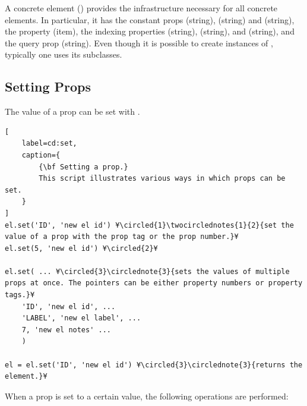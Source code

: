 \documentclass{tufte-handout}
\begin{document}
A concrete element () provides the infrastructure necessary for all concrete elements. 
In particular, it has the constant props  (string),  (string) and  (string), the property  (item), the indexing properties  (string),  (string), and  (string), and the query prop  (string).
Even though it is possible to create instances of , typically one uses its subclasses.

\subsection{Setting Props}

The value of a prop can be set with .
%
\begin{lstlisting}[
	label=cd:set,
	caption={
		{\bf Setting a prop.}
		This script illustrates various ways in which props can be set.
	}
]
el.set('ID', 'new el id') ¥\circled{1}\twocirclednotes{1}{2}{set the value of a prop with the prop tag or the prop number.}¥
el.set(5, 'new el id') ¥\circled{2}¥

el.set( ... ¥\circled{3}\circlednote{3}{sets the values of multiple props at once. The pointers can be either property numbers or property tags.}¥
	'ID', 'new el id', ...
	'LABEL', 'new el label', ...
	7, 'new el notes' ...
	) 

el = el.set('ID', 'new el id') ¥\circled{3}\circlednote{3}{returns the element.}¥
\end{lstlisting}
%
When a prop is set to a certain value, the following operations are performed:
\end{document}
